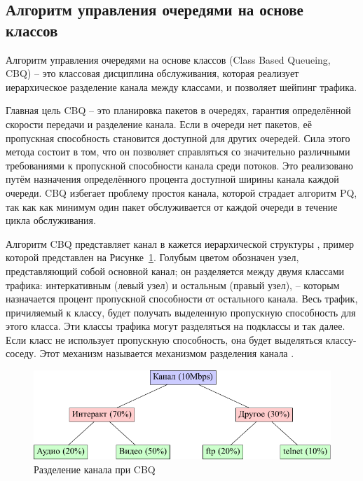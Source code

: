     \subsection{Алгоритм управления очередями на основе классов}

        Алгоритм управления очередями на основе классов (Class Based Queueing, CBQ) -- это
        классовая дисциплина обслуживания, которая реализует
        иерархическое разделение канала между классами, и позволяет
        шейпинг трафика. \cite{tccbq}

        Главная цель CBQ -- это планировка пакетов в очередях, гарантия определённой
        скорости передачи и разделение канала. Если в очереди нет пакетов, её
        пропускная способность становится доступной для других очередей. Сила
        этого метода состоит в том, что он позволяет справляться со значительно
        различными требованиями к пропускной способности канала среди потоков. Это
        реализовано путём назначения определённого процента доступной ширины
        канала каждой очереди. CBQ избегает проблему простоя канала, которой страдает
        алгоритм PQ, так как как минимум один пакет обслуживается от каждой очереди
        в течение цикла обслуживания.\cite{packethandling}

		Алгоритм CBQ представляет канал в кажется иерархической структуры \cite{linksharing},
		пример которой представлен на Рисунке~\ref{pic:cbq}. Голубым цветом обозначен узел,
		представляющий собой основной канал; он разделяется между двумя классами трафика:
		интеркативным (левый узел) и остальным (правый узел), -- которым назначается процент
		пропускной способности от остального канала. Весь трафик, причиляемый к классу,
		будет получать выделенную пропускную способность для этого класса. Эти
		классы трафика могут разделяться на подклассы и так далее. Если класс не использует
		пропускную способность, она будет выделяться классу-соседу. Этот механизм
		называется механизмом разделения канала \cite{linksharing}. 

        \begin{figure}[ht!]
			\center
            \includegraphics[scale=1.3]{./pdfimages/cbq.pdf}
            \caption{Разделение канала при CBQ}
			\label{pic:cbq}
        \end{figure}

